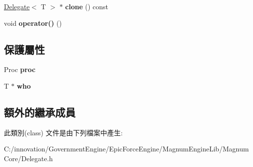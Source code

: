 \begin{DoxyCompactItemize}
\item 
\hyperlink{class_i_dream_sky_1_1_delegate}{Delegate}$<$ T $>$ $\ast$ {\bfseries clone} () const \hypertarget{class_i_dream_sky_1_1_delegate_abfca563b846418f3a58ddc5b4ecfbfd9}{}\label{class_i_dream_sky_1_1_delegate_abfca563b846418f3a58ddc5b4ecfbfd9}

\item 
void {\bfseries operator()} ()\hypertarget{class_i_dream_sky_1_1_delegate_a01f3417f3574a7f1e08a039cd9439c10}{}\label{class_i_dream_sky_1_1_delegate_a01f3417f3574a7f1e08a039cd9439c10}

\end{DoxyCompactItemize}
\subsection*{保護屬性}
\begin{DoxyCompactItemize}
\item 
Proc {\bfseries proc}\hypertarget{class_i_dream_sky_1_1_delegate_ac1160a08e94d107ed1d55608096faae9}{}\label{class_i_dream_sky_1_1_delegate_ac1160a08e94d107ed1d55608096faae9}

\item 
T $\ast$ {\bfseries who}\hypertarget{class_i_dream_sky_1_1_delegate_a0fcc354727d4b66b37abc9c3f307a854}{}\label{class_i_dream_sky_1_1_delegate_a0fcc354727d4b66b37abc9c3f307a854}

\end{DoxyCompactItemize}
\subsection*{額外的繼承成員}


此類別(class) 文件是由下列檔案中產生\+:\begin{DoxyCompactItemize}
\item 
C\+:/innovation/\+Government\+Engine/\+Epic\+Force\+Engine/\+Magnum\+Engine\+Lib/\+Magnum\+Core/Delegate.\+h\end{DoxyCompactItemize}
